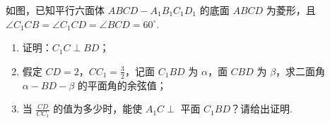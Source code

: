 \begin{problem}
如图，已知平行六面体 \(ABCD-A_1B_1C_1D_1\) 的底面 \(ABCD\) 为菱形，且 \(\angle C_1CB=\angle C_1CD=\angle BCD=60^\circ\).

\begin{enumerate}
\item 证明：\(C_1C\perp BD\)；
\item 假定 \(CD=2\)，\(CC_1=\frac32\)，记面 \(C_1BD\) 为 \(\alpha\)，面 \(CBD\) 为 \(\beta\)，求二面角 \(\alpha-BD-\beta\) 的平面角的余弦值；
\item 当 \(\frac{CD}{CC_1}\) 的值为多少时，能使 \(A_1C\perp\) 平面 \(C_1BD\)？请给出证明.
\end{enumerate}

\end{problem}

